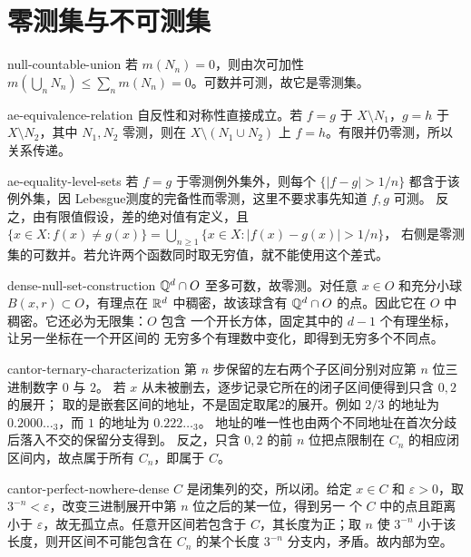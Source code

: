 \chapter{零测集与不可测集}

\begin{solution}{null-countable-union}
若 $m(N_n)=0$，则由次可加性
$m(\bigcup_nN_n)\le\sum_nm(N_n)=0$。可数并可测，故它是零测集。
\end{solution}

\begin{solution}{ae-equivalence-relation}
自反性和对称性直接成立。若 $f=g$ 于 $X\setminus N_1$，$g=h$ 于
$X\setminus N_2$，其中 $N_1,N_2$ 零测，则在
$X\setminus(N_1\cup N_2)$ 上 $f=h$。有限并仍零测，所以关系传递。
\end{solution}

\begin{solution}{ae-equality-level-sets}
若 $f=g$ 于零测例外集外，则每个 $\{|f-g|>1/n\}$ 都含于该例外集，因
Lebesgue测度的完备性而零测，这里不要求事先知道 $f,g$ 可测。
反之，由有限值假设，差的绝对值有定义，且
$\{x\in X:f(x)\ne g(x)\}=\bigcup_{n\ge1}\{x\in X:|f(x)-g(x)|>1/n\}$，
右侧是零测集的可数并。若允许两个函数同时取无穷值，就不能使用这个差式。
\end{solution}

\begin{solution}{dense-null-set-construction}
$\mathbb{Q}^d\cap O$ 至多可数，故零测。对任意 $x\in O$ 和充分小球
$B(x,r)\subset O$，有理点在 $\mathbb{R}^d$ 中稠密，故该球含有
$\mathbb{Q}^d\cap O$ 的点。因此它在 $O$ 中稠密。它还必为无限集：$O$ 包含
一个开长方体，固定其中的 $d-1$ 个有理坐标，让另一坐标在一个开区间的
无穷多个有理数中变化，即得到无穷多个不同点。
\end{solution}

\begin{solution}{cantor-ternary-characterization}
第 $n$ 步保留的左右两个子区间分别对应第 $n$ 位三进制数字 $0$ 与 $2$。
若 $x$ 从未被删去，逐步记录它所在的闭子区间便得到只含 $0,2$ 的展开；
取的是嵌套区间的地址，不是固定取尾2的展开。例如 $2/3$ 的地址为
$0.2000\ldots{}_3$，而 $1$ 的地址为 $0.222\ldots{}_3$。
地址的唯一性也由两个不同地址在首次分歧后落入不交的保留分支得到。
反之，只含 $0,2$ 的前
$n$ 位把点限制在 $C_n$ 的相应闭区间内，故点属于所有 $C_n$，即属于 $C$。
\end{solution}

\begin{solution}{cantor-perfect-nowhere-dense}
$C$ 是闭集列的交，所以闭。给定 $x\in C$ 和 $\varepsilon>0$，取
$3^{-n}<\varepsilon$，改变三进制展开中第 $n$ 位之后的某一位，得到另一
个 $C$ 中的点且距离小于 $\varepsilon$，故无孤立点。任意开区间若包含于
$C$，其长度为正；取 $n$ 使 $3^{-n}$ 小于该长度，则开区间不可能包含在
$C_n$ 的某个长度 $3^{-n}$ 分支内，矛盾。故内部为空。
\end{solution}

